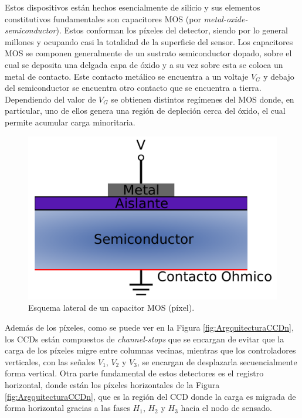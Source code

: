 Estos dispositivos están hechos esencialmente de silicio y sus elementos constitutivos fundamentales son capacitores MOS (por \textit{metal-oxide-semiconductor}). Estos conforman los píxeles del detector, siendo por lo general millones y ocupando casi la totalidad de la superficie del sensor. Los capacitores MOS se componen generalmente de un sustrato semiconductor dopado, sobre el cual se deposita una delgada capa de óxido y a su vez sobre esta se coloca un metal de contacto. Este contacto metálico se encuentra a un voltaje $V_{G}$ y debajo del semiconductor se encuentra otro contacto que se encuentra a tierra. Dependiendo del valor de $V_{G}$ se obtienen distintos regímenes del MOS\cite{Chenming} donde, en particular, uno de ellos genera una región de depleción cerca del óxido, el cual permite acumular carga minoritaria.
\begin{figure}[h]
    \centering
        \includegraphics[scale=.35]{Figs/PixelCrossSection.pdf}
    \caption{\footnotesize{Esquema lateral de un capacitor MOS (píxel).}}
    \label{fig:PixelCrossSection}
\end{figure}
Además de los píxeles, como se puede ver en la Figura \ref{fig:ArgquitecturaCCDn}, los CCDs están compuestos de \textit{channel-stops} que se encargan de evitar que la carga de los píxeles migre entre columnas vecinas, mientras que los controladores verticales, con las señales $V_{1}$, $V_{2}$ y $V_{3}$, se encargan de desplazarla secuencialmente forma vertical. Otra parte fundamental de estos detectores es el registro horizontal, donde están los píxeles horizontales de la Figura \ref{fig:ArgquitecturaCCDn}, que es la región del CCD donde la carga es migrada de forma horizontal gracias a las fases $H_{1}$, $H_{2}$ y $H_{3}$ hacia el nodo de sensado.
